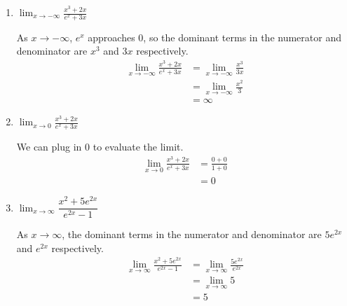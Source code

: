 \documentclass{article}
\begin{document}
\begin{enumerate}[resume]
\begin{enumerate}
  \item


    \begin{problem}[\vfill\newpage]
      $\displaystyle \lim_{x \to -\infty} \frac{x^3 + 2x}{e^x + 3x}$
    \end{problem}

    \begin{solution}
      As $x\to -\infty$, $e^x$ approaches $0$, so the dominant terms in the numerator and denominator
      are $x^3$ and $3x$ respectively.
      \begin{align*}
        \lim_{x \to -\infty} \frac{x^3 + 2x}{e^x + 3x} &= 
        \lim_{x \to -\infty} \frac{x^3}{3x} \\
        &= \lim_{x \to -\infty} \frac{x^2}{3} \\
        &= \infty
      \end{align*}
    \end{solution}
    

  \item
    \begin{problem}[\vfill]
      $\displaystyle \lim_{x \to 0} \frac{x^3 + 2x}{e^x + 3x}$      
    \end{problem}

    \begin{solution}
      We can plug in $0$ to evaluate the limit.
      \begin{align*}
        \lim_{x \to 0} \frac{x^3 + 2x}{e^x + 3x} &= 
        \frac{0+0}{1 + 0} \\
        &= 0
      \end{align*}
    \end{solution}

  \item

    \begin{problem}[\vfill]
      $\displaystyle \lim_{x \to \infty} \dfrac{x^2 + 5 e^{2x}}{e^{2x} - 1}$
    \end{problem}

    \begin{solution}
      As $x\to \infty$, the dominant terms in the numerator and denominator
      are $5e^{2x}$ and $e^{2x}$ respectively.
      \begin{align*}
        \lim_{x \to \infty} \frac{x^2 + 5 e^{2x}}{e^{2x} - 1} &=
        \lim_{x \to \infty} \frac{5e^{2x}}{e^{2x}} \\
        &= \lim_{x \to \infty} 5 \\
        &= 5
      \end{align*}
    \end{solution}


\end{enumerate}
\end{enumerate}
\end{document}
